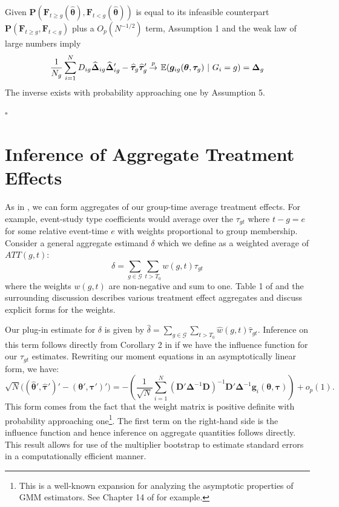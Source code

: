\documentclass[12pt]{article}
\begin{document}
Given $\bm P(\bm{F}_{t \geq g}(\widehat{\bm{\theta}}), \bm{F}_{t < g}(\widehat{\bm{\theta}}))$ is equal to its infeasible counterpart $\bm P(\bm{F}_{t \geq g}, \bm{F}_{t < g})$ plus a $O_p(N^{-1/2})$ term, Assumption 1 and the weak law of large numbers imply 
\begin{equation*}
    \frac{1}{N_g} \sum_{i = 1}^N D_{ig} \widehat{\bm \Delta}_{ig} \widehat{\bm \Delta}_{ig}' - \widehat{\bm \tau}_g \widehat{\bm \tau}_g' \plim \expec{\bm g_{ig}(\bm{\theta}, \bm \tau_g)}{G_i = g} = \bm \Delta_g
\end{equation*}
The inverse exists with probability approaching one by Assumption 5.

$\square$


\section{Inference of Aggregate Treatment Effects}

As in \citet{Callaway_Santanna_2021}, we can form aggregates of our group-time average treatment effects. For example, event-study type coefficients would average over the $\tau_{gt}$ where $t - g = e$ for some relative event-time $e$ with weights proportional to group membership. Consider a general aggregate estimand $\delta$ which we define as a weighted average of $ATT(g,t)$:
\begin{equation}
\delta = \sum_{g\in \mathcal{G}} \sum_{t > T_0} w(g,t) \tau_{gt}
\end{equation}
where the weights $w(g,t)$ are non-negative and sum to one. Table 1 of \citet{Callaway_Santanna_2021} and the surrounding discussion describes various treatment effect aggregates and discuss explicit forms for the weights. 

Our plug-in estimate for $\delta$ is given by $\hat{\delta} = \sum_{g\in \mathcal{G}} \sum_{t > T_0} \hat{w}(g,t) \hat{\tau}_{gt}$. Inference on this term follows directly from Corollary 2 in \citet{Callaway_Santanna_2021} if we have the influence function for our $\tau_{gt}$ estimates. Rewriting our moment equations in an asymptotically linear form, we have:
\begin{equation}
    \sqrt{N}\Big( (\widehat{\bm{\theta}}', \widehat{\bm \tau}')' - (\bm{\theta}', \bm \tau')' \Big) = - \left( \frac{1}{\sqrt{N}} \sum_{i = 1}^N (\bm D' \bm \Delta^{-1} \bm D)^{-1} \bm D' \bm \Delta^{-1} \bm g_i(\bm{\theta}, \bm \tau) \right) + o_p(1).
\end{equation}
This form comes from the fact that the weight matrix is positive definite with probability approaching one\footnote{This is a well-known expansion for analyzing the asymptotic properties of GMM estimators. See Chapter 14 of \citet{Wooldridge_2010} for example.}. The first term on the right-hand side is the influence function and hence inference on aggregate quantities follows directly. This result allows for use of the multiplier bootstrap to estimate standard errors in a computationally efficient manner.
\end{document}
